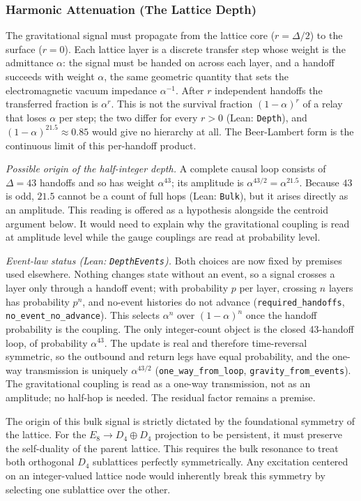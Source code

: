 \subsubsection{Harmonic Attenuation (The Lattice Depth)}
The gravitational signal must propagate from the lattice core ($r = \Delta/2$) to the surface ($r = 0$). Each lattice layer is a discrete transfer step whose weight is the admittance $\alpha$: the signal must be handed on across each layer, and a handoff succeeds with weight $\alpha$, the same geometric quantity that sets the electromagnetic vacuum impedance $\alpha^{-1}$. After $r$ independent handoffs the transferred fraction is $\alpha^r$. This is not the survival fraction $(1-\alpha)^r$ of a relay that loses $\alpha$ per step; the two differ for every $r>0$ (Lean: \texttt{Depth}), and $(1-\alpha)^{21.5}\approx0.85$ would give no hierarchy at all. The Beer-Lambert form is the continuous limit of this per-handoff product.

\textit{Possible origin of the half-integer depth.} A complete causal loop consists of $\Delta=43$ handoffs and so has weight $\alpha^{43}$; its amplitude is $\alpha^{43/2}=\alpha^{21.5}$. Because $43$ is odd, $21.5$ cannot be a count of full hops (Lean: \texttt{Bulk}), but it arises directly as an amplitude. This reading is offered as a hypothesis alongside the centroid argument below. It would need to explain why the gravitational coupling is read at amplitude level while the gauge couplings are read at probability level.

\textit{Event-law status (Lean: \texttt{DepthEvents}).} Both choices are now fixed by premises used elsewhere. Nothing changes state without an event, so a signal crosses a layer only through a handoff event; with probability $p$ per layer, crossing $n$ layers has probability $p^n$, and no-event histories do not advance (\texttt{required\_handoffs}, \texttt{no\_event\_no\_advance}). This selects $\alpha^n$ over $(1-\alpha)^n$ once the handoff probability is the coupling. The only integer-count object is the closed 43-handoff loop, of probability $\alpha^{43}$. The update is real and therefore time-reversal symmetric, so the outbound and return legs have equal probability, and the one-way transmission is uniquely $\alpha^{43/2}$ (\texttt{one\_way\_from\_loop}, \texttt{gravity\_from\_events}). The gravitational coupling is read as a one-way transmission, not as an amplitude; no half-hop is needed. The residual factor remains a premise.

The origin of this bulk signal is strictly dictated by the foundational symmetry of the lattice. For the $E_8 \to D_4 \oplus D_4$ projection to be persistent, it must preserve the self-duality of the parent lattice. This requires the bulk resonance to treat both orthogonal $D_4$ sublattices perfectly symmetrically. Any excitation centered on an integer-valued lattice node would inherently break this symmetry by selecting one sublattice over the other. 

